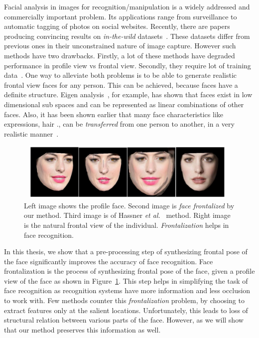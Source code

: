 Facial analysis in images for recognition/manipulation is a widely addressed and commercially important problem. 
Its applications range from surveillance to automatic tagging of photos on social websites. 
Recently, there are papers producing convincing results on {\em in-the-wild}
datasets~\cite{xhuCVPR12_wild,DBLP:journals/corr/HassnerHPE14}. These
datasets differ from previous ones in their unconstrained nature of image capture.
However such methods have two drawbacks. Firstly, a lot of these methods have degraded performance in profile view vs frontal view. 
Secondly, they require lot of training data~\cite{HuLT14}. One way to alleviate both problems is to be able 
to generate realistic frontal view faces for any person. This can be achieved, because faces have a definite 
structure. Eigen analysis~\cite{Belhumeur:1997:EVF:261506.261512}, for example, has shown that faces exist in low dimensional sub spaces and can be represented as linear combinations of other faces. Also, it has been shown earlier that many face characteristics like expressions, hair \etc., can be \emph{transferred} from one person to another, in a very realistic manner~\cite{conf/fgr/SaragihLC11a}.

\begin{figure}
\begin{center}\includegraphics[width=11.0cm,height=2.8cm]{front/figures/sample_result_f.png}\end{center}
\caption{Left image shows the profile face. Second image is {\em face frontalized} by our method. Third image is of Hassner {\em et al.}~\cite{DBLP:journals/corr/HassnerHPE14} method. Right image is the natural frontal view of the individual. {\em Frontalization} helps in face recognition. }
\label{fig:sample_result}
\end{figure}

In this thesis, we show that a pre-processing step of synthesizing frontal pose of the face
significantly improves the accuracy of face recognition. Face frontalization is the process of
synthesizing frontal pose of the face, given a profile view of the face as shown in
Figure~\ref{fig:sample_result}. This step helps in simplifying the task of face recognition as
recognition systems have more information and less occlusion to work with. Few methods counter this
{\em frontalization} problem, by choosing to extract features only at the salient locations.
Unfortunately, this leads to loss of structural relation between various parts of the face. However,
as we will show that our method preserves this information as well. 

